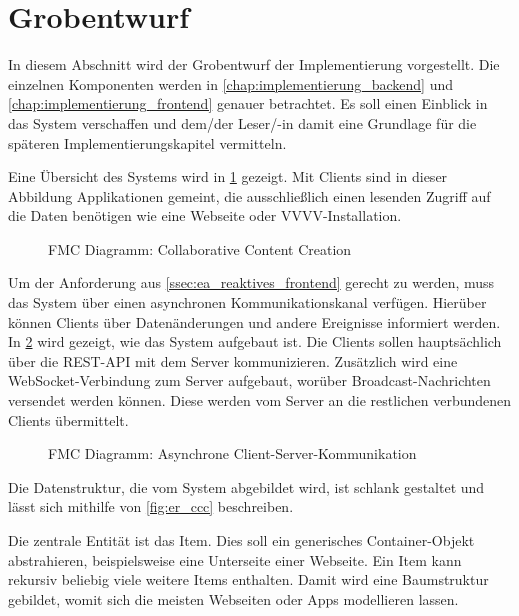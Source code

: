 \section{Grobentwurf}
\label{sec:k_grobentwurf}

In diesem Abschnitt wird der Grobentwurf der Implementierung vorgestellt.  Die
einzelnen Komponenten werden in \cref{chap:implementierung_backend} und
\ref{chap:implementierung_frontend} genauer betrachtet.  Es soll einen Einblick
in das System verschaffen und dem/der Leser/-in damit eine Grundlage für die
späteren Implementierungskapitel vermitteln.

Eine Übersicht des Systems wird in \cref{fig:fmc_ccc} gezeigt.  Mit Clients
sind in dieser Abbildung Applikationen gemeint, die ausschließlich einen
lesenden Zugriff auf die Daten benötigen wie eine Webseite oder
VVVV-Installation.

\begin{figure}
    \centering
    
    \caption{FMC Diagramm: Collaborative Content Creation}
    \label{fig:fmc_ccc}
\end{figure}

Um der Anforderung aus \cref{ssec:ea_reaktives_frontend} gerecht zu werden, muss
das System über einen asynchronen Kommunikationskanal verfügen.  Hierüber können
Clients über Datenänderungen und andere Ereignisse informiert werden.  In
\cref{fig:fmc_async_client_server} wird gezeigt, wie das System aufgebaut ist.
Die Clients sollen hauptsächlich über die REST-API mit dem Server
kommunizieren.  Zusätzlich wird eine WebSocket-Verbindung zum Server aufgebaut,
worüber Broadcast-Nachrichten versendet werden können.  Diese werden vom Server
an die restlichen verbundenen Clients übermittelt.

\begin{figure}
    \centering
    
    \caption{FMC Diagramm: Asynchrone Client-Server-Kommunikation}
    \label{fig:fmc_async_client_server}
\end{figure}

Die Datenstruktur, die vom System abgebildet wird, ist schlank gestaltet und
lässt sich mithilfe von \cref{fig:er_ccc} beschreiben.

Die zentrale Entität ist das Item.  Dies soll ein generisches Container-Objekt
abstrahieren, beispielsweise eine Unterseite einer Webseite.  Ein Item kann
rekursiv beliebig viele weitere Items enthalten.  Damit wird eine Baumstruktur
gebildet, womit sich die meisten Webseiten oder Apps modellieren lassen.

